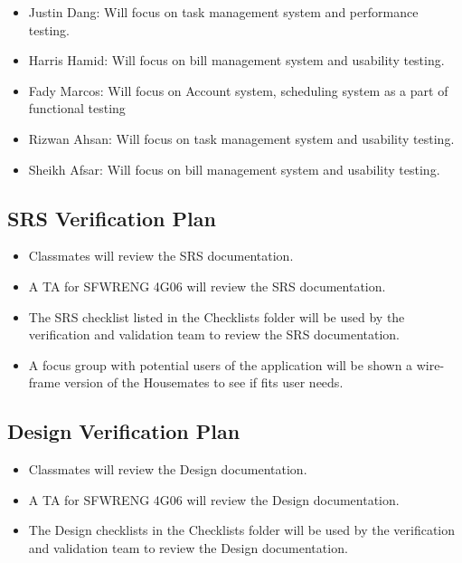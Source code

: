 \documentclass[12pt, titlepage]{article}
\begin{document}
\begin{itemize}
    \item Justin Dang: Will focus on task management system and performance testing.
    \item Harris Hamid: Will focus on bill management system and usability testing.
    \item Fady Marcos: Will focus on Account system, scheduling system as a part of functional testing
    \item Rizwan Ahsan: Will focus on task management system and usability testing. 
    \item Sheikh Afsar: Will focus on bill management system and usability testing.
\end{itemize}



\subsection{SRS Verification Plan}

\begin{itemize}
    \item Classmates will review the SRS documentation.
    \item A TA for SFWRENG 4G06 will review the SRS documentation.
    \item The SRS checklist listed in the Checklists folder will be used by the verification and validation team to review the SRS documentation.
    \item A focus group with potential users of the application will be shown a wire-frame version of the Housemates to see if fits user needs.
\end{itemize}



\subsection{Design Verification Plan}


\begin{itemize}
    \item Classmates will review the Design documentation.
    \item A TA for SFWRENG 4G06 will review the Design documentation.
    \item The Design checklists in the Checklists folder will be used by the verification and validation team to review the Design documentation.
\end{itemize}
\end{document}
